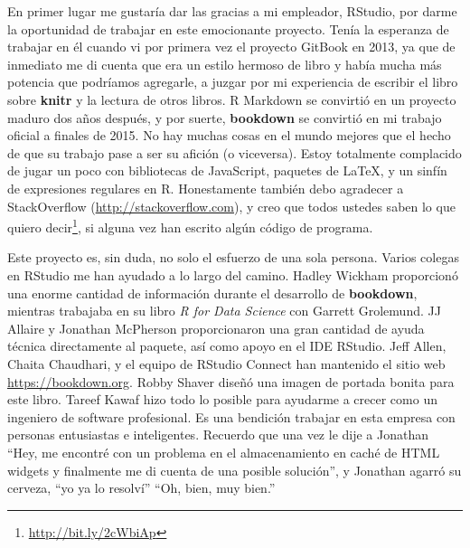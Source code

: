 \documentclass[12pt,]{krantz}
\renewcommand{\href}[2]{#2\footnote{\url{#1}}}
\theoremstyle{definition}
\theoremstyle{definition}
\theoremstyle{definition}
\theoremstyle{remark}
\begin{document}
En primer lugar me gustaría dar las gracias a mi empleador, RStudio, por
darme la oportunidad de trabajar en este emocionante proyecto. Tenía la
esperanza de trabajar en él cuando vi por primera vez el proyecto
GitBook en 2013, ya que de inmediato me di cuenta que era un estilo
hermoso de libro y había mucha más potencia que podríamos agregarle, a
juzgar por mi experiencia de escribir el libro sobre \textbf{knitr}
\citep{xie2015} y la lectura de otros libros. R Markdown se convirtió en
un proyecto maduro dos años después, y por suerte, \textbf{bookdown} se
convirtió en mi trabajo oficial a finales de 2015. No hay muchas cosas
en el mundo mejores que el hecho de que su trabajo pase a ser su afición
(o viceversa). Estoy totalmente complacido de jugar un poco con
bibliotecas de JavaScript, paquetes de LaTeX, y un sinfín de expresiones
regulares en R. Honestamente también debo agradecer a StackOverflow
(\url{http://stackoverflow.com}), y creo que todos ustedes saben
\href{http://bit.ly/2cWbiAp}{lo que quiero decir}, si alguna vez han
escrito algún código de programa.

Este proyecto es, sin duda, no solo el esfuerzo de una sola persona.
Varios colegas en RStudio me han ayudado a lo largo del camino. Hadley
Wickham proporcionó una enorme cantidad de información durante el
desarrollo de \textbf{bookdown}, mientras trabajaba en su libro \emph{R
for Data Science} con Garrett Grolemund. JJ Allaire y Jonathan McPherson
proporcionaron una gran cantidad de ayuda técnica directamente al
paquete, así como apoyo en el IDE RStudio. Jeff Allen, Chaita Chaudhari,
y el equipo de RStudio Connect han mantenido el sitio web
\url{https://bookdown.org}. Robby Shaver diseñó una imagen de portada
bonita para este libro. Tareef Kawaf hizo todo lo posible para ayudarme
a crecer como un ingeniero de software profesional. Es una bendición
trabajar en esta empresa con personas entusiastas e inteligentes.
Recuerdo que una vez le dije a Jonathan ``Hey, me encontré con un
problema en el almacenamiento en caché de HTML widgets y finalmente me
di cuenta de una posible solución'', y Jonathan agarró su cerveza, ``yo
ya lo resolví'' ``Oh, bien, muy bien.''
\end{document}
